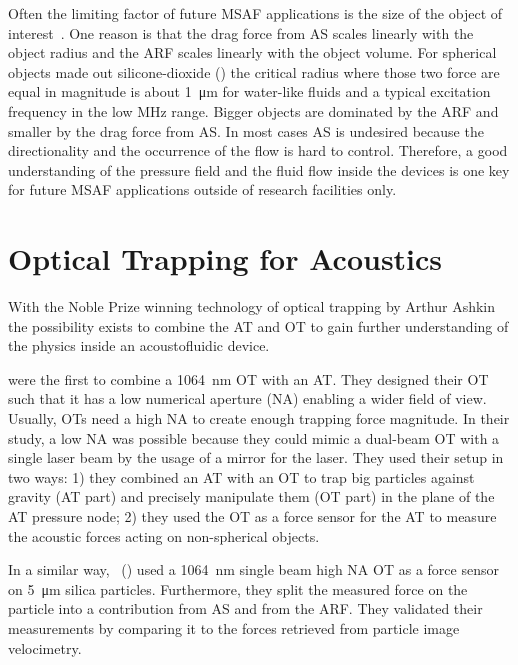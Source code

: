 Often the limiting factor of future MSAF applications is the size of the object 
of interest~\cite{Barnkob2012}. One reason is that the drag force from AS 
scales linearly with the object radius and the ARF scales linearly with the 
object volume. For spherical objects made out silicone-dioxide (\SiO) the 
critical radius where those two force are equal in magnitude is about 
\SI{1}{\um} for water-like fluids and a typical excitation frequency in the low 
\si{\mega\hertz} range. Bigger objects are dominated by the ARF and smaller by 
the drag force from AS. In most cases AS is undesired because the 
directionality and the occurrence of the flow is hard to control. Therefore, a 
good understanding of the pressure field and the fluid flow inside the devices 
is one key for future MSAF applications outside of research facilities only.

\section{Optical Trapping for Acoustics}

With the Noble Prize winning technology of optical trapping by Arthur 
Ashkin~\cite{Ashkin1978,Ashkin1987,Ashkin2002,Ashkin1986,Ashkin1992,Ashkin1997} 
the possibility exists to combine the AT and OT to gain further understanding 
of the physics inside an acoustofluidic device.

 were the first to combine a \SI{1064}{\nm} OT with an 
AT. They designed their OT such that it has a low numerical aperture (NA) 
enabling a wider field of view. Usually, OTs need a high NA to create enough 
trapping force magnitude. In their study, a low NA was possible because they 
could mimic a dual-beam OT with a single laser beam by the usage of a mirror 
for the laser. They used their setup in two ways: 1) they combined an AT with 
an OT to trap big particles against gravity (AT part) and precisely manipulate 
them (OT part) in the plane of the AT pressure node; 2) they used the OT as a 
force sensor for the AT to measure the acoustic forces acting on non-spherical 
objects.

In a similar way, ~(\citeyear{Bassindale2014}) used a 
\SI{1064}{\nm} single beam high NA OT as a force sensor on \SI{5}{\um} silica 
particles. Furthermore, they split the measured force on the particle into a 
contribution from AS and from the ARF. They validated their measurements by 
comparing it to the forces retrieved from particle image velocimetry.


